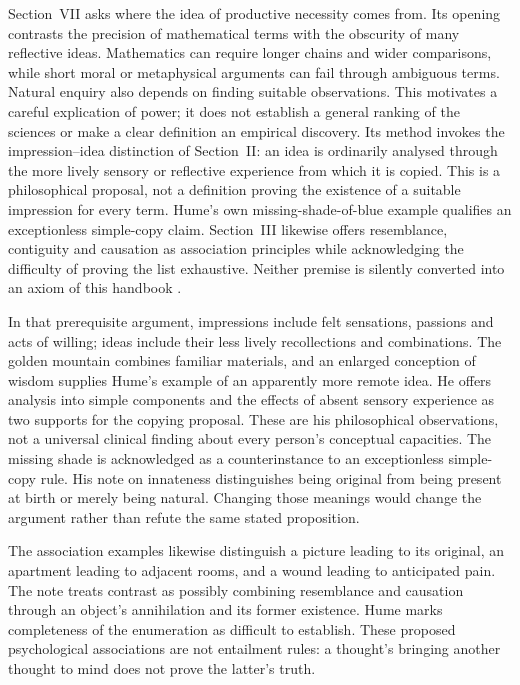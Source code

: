 Section~VII asks where the idea of productive necessity comes from.
Its opening contrasts the precision of mathematical terms with the
obscurity of many reflective ideas. Mathematics can require longer
chains and wider comparisons, while short moral or metaphysical
arguments can fail through ambiguous terms. Natural enquiry also
depends on finding suitable observations. This motivates a careful
explication of power; it does not establish a general ranking of
the sciences or make a clear definition an empirical discovery.
Its method invokes the impression--idea distinction of Section~II:
an idea is ordinarily analysed through the more lively sensory or
reflective experience from which it is copied. This is a philosophical
proposal, not a definition proving the existence of a suitable
impression for every term. Hume's own missing-shade-of-blue example
qualifies an exceptionless simple-copy claim. Section~III likewise
offers resemblance, contiguity and causation as association principles
while acknowledging the difficulty of proving the list exhaustive.
Neither premise is silently converted into an axiom of this handbook
\parencite[E~2.3--2.9, 3.1--3.3, 7.1--7.5]{Hume1777EnquiryHTO}.

In that prerequisite argument, impressions include felt sensations,
passions and acts of willing; ideas include their less lively
recollections and combinations. The golden mountain combines familiar
materials, and an enlarged conception of wisdom supplies Hume's
example of an apparently more remote idea. He offers analysis into
simple components and the effects of absent sensory experience as
two supports for the copying proposal. These are his philosophical
observations, not a universal clinical finding about every person's
conceptual capacities. The missing shade is acknowledged as a
counterinstance to an exceptionless simple-copy rule. His note on
innateness distinguishes being original from being present at birth
or merely being natural. Changing those meanings would change the
argument rather than refute the same stated proposition.

The association examples likewise distinguish a picture leading to
its original, an apartment leading to adjacent rooms, and a wound
leading to anticipated pain. The note treats contrast as possibly
combining resemblance and causation through an object's annihilation
and its former existence. Hume marks completeness of the enumeration
as difficult to establish. These proposed psychological associations
are not entailment rules: a thought's bringing another thought to
mind does not prove the latter's truth.

